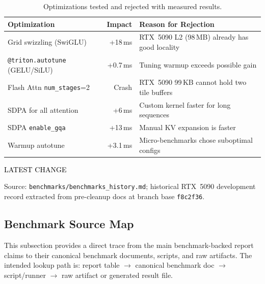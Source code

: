 \documentclass{article}
\newcommand{\latestchglabel}{{\setlength{\fboxsep}{1pt}\colorbox{yellow!65}{\textcolor{black}{\scriptsize LATEST CHANGE}}}}
\newcommand{\latestchgblock}[1]{%
  \begingroup
  \setlength{\fboxsep}{4pt}%
  \colorbox{yellow!20}{%
    \parbox{\dimexpr\linewidth-2\fboxsep\relax}{#1}%
  }%
  \endgroup
}
\newcommand{\latestsource}[1]{%
  \par\noindent
  {\footnotesize \latestchglabel\ \parbox[t]{0.9\linewidth}{#1}}\par
}
\begin{document}
\begin{table}[h]
\centering
\caption{Optimizations tested and rejected with measured results.}
\label{tab:rejected}
\small
\begin{tabular}{@{}lrl@{}}
\toprule
\textbf{Optimization} & \textbf{Impact} & \textbf{Reason for Rejection} \\
\midrule
Grid swizzling (SwiGLU) & +18\,ms & RTX~5090 L2 (98\,MB) already has good locality \\
\texttt{@triton.autotune} (GELU/SiLU) & +0.7\,ms & Tuning warmup exceeds possible gain \\
Flash Attn \texttt{num\_stages}=2 & Crash & RTX~5090 99\,KB cannot hold two tile buffers \\
SDPA for all attention & +6\,ms & Custom kernel faster for long sequences \\
SDPA \texttt{enable\_gqa} & +13\,ms & Manual KV expansion is faster \\
Warmup autotune & +3.1\,ms & Micro-benchmarks chose suboptimal configs \\
\bottomrule
\end{tabular}
\end{table}

\latestsource{Source: \texttt{benchmarks/benchmarks\_history.md}; historical RTX~5090 development record extracted from pre-cleanup docs at branch base \texttt{f8c2f36}.}

\subsection{Benchmark Source Map}
\label{app:benchmap}

\latestchgblock{This subsection provides a direct trace from the main benchmark-backed report claims to their canonical benchmark documents, scripts, and raw artifacts. The intended lookup path is: report table $\rightarrow$ canonical benchmark doc $\rightarrow$ script/runner $\rightarrow$ raw artifact or generated result file.}
\end{document}
